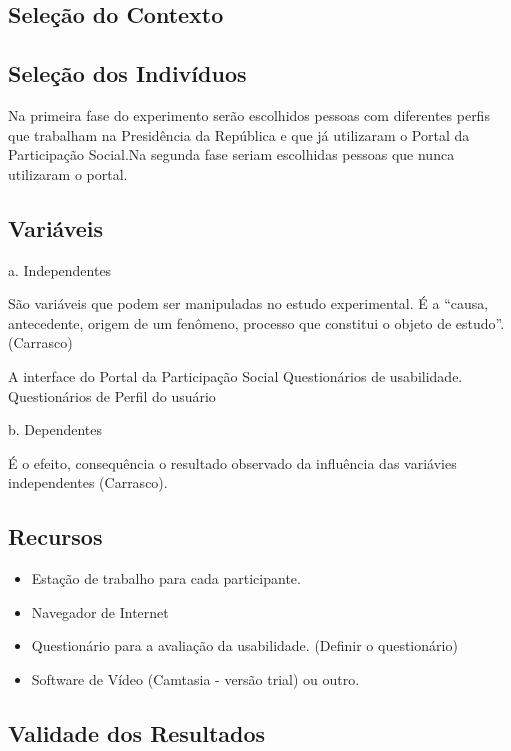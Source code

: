 
\subsection{Seleção do Contexto}

\subsection{Seleção dos Indivíduos}

	Na primeira fase do experimento serão escolhidos pessoas com diferentes perfis que trabalham na Presidência da República e que já utilizaram o Portal da Participação Social.Na segunda fase seriam escolhidas pessoas que nunca utilizaram o portal.

\subsection{Variáveis}
 
a. Independentes

São variáveis que podem ser manipuladas no estudo experimental. É a “causa, antecedente, origem de um fenômeno, processo que constitui o objeto de estudo”.(Carrasco)


A interface do Portal da Participação Social
Questionários de usabilidade.
Questionários de Perfil do usuário


b. Dependentes

É o efeito, consequência o resultado observado da influência das variávies independentes (Carrasco).


\subsection{Recursos}

\begin{itemize}
\item Estação de trabalho para cada participante.
\item Navegador de Internet
\item Questionário para a avaliação da usabilidade. (Definir o questionário)
\item Software de Vídeo (Camtasia - versão trial) ou outro.
\end{itemize}

\subsection{Validade dos Resultados}



